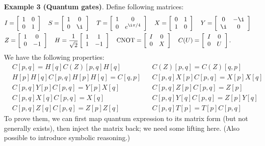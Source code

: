 \vspace{0.4cm}

\noindent\textbf{Example 3 (Quantum gates)}.
Define following matrices:
\begin{align*}
    &I = \left[\begin{array}{cc}1 & 0 \\ 0 & 1\end{array}\right]\quad
    S = \left[\begin{array}{cc}1 & 0 \\ 0 & \i\end{array}\right]\quad
    T = \left[\begin{array}{cc}1 & 0 \\ 0 & e^{\i\pi/4}\end{array}\right]\quad
    X = \left[\begin{array}{cc}0 & 1 \\ 1 & 0\end{array}\right]\quad
    Y = \left[\begin{array}{cc}0 & -\i \\ \i & 0\end{array}\right]\\
    &Z = \left[\begin{array}{cc}1 & 0 \\ 0 & -1\end{array}\right] \quad
    H = \frac{1}{\sqrt{2}}\left[\begin{array}{cc}1 & 1 \\ 1 & -1\end{array}\right]\quad
    {\rm CNOT} = \left[\begin{array}{cc}I & 0 \\ 0 & X\end{array}\right]\quad
    C(U) = \left[\begin{array}{cc}I & 0 \\ 0 & U\end{array}\right].
\end{align*}
We have the following properties:
\begin{align*}
    & C[p,q] = H[q]C(Z)[p,q]H[q] && C(Z)[p,q] = C(Z)[q,p] \\
    & H[p]H[q]C[p,q]H[p]H[q] = C[q,p] && C[p,q]X[p]C[p,q] = X[p]X[q] \\
    & C[p, q]Y[p]C[p, q] = Y[p]X[q] && C[p, q]Z[p]C[p, q] = Z[p] \\
    & C[p, q]X[q]C[p, q] = X[q] && C[p, q]Y[q]C[p, q] = Z[p]Y[q] \\
    & C[p, q]Z[q]C[p, q] = Z[p]Z[q] && C[p, q]T[p] = T[p]C[p, q]
\end{align*}
To prove them, we can first map quantum expression to its matrix form (but not generally exists), then inject the matrix back; we need some lifting here. (Also possible to introduce symbolic reasoning.)

